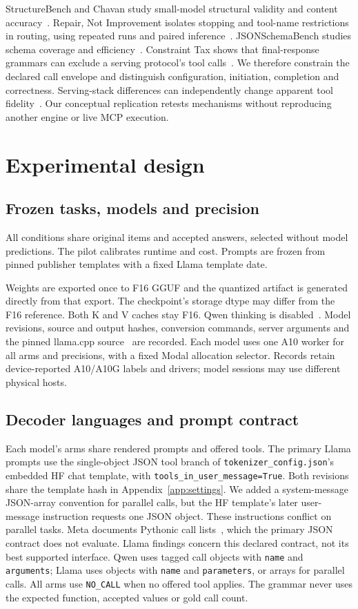 \documentclass[10pt,twocolumn]{article}
\begin{document}
StructureBench and Chavan study small-model structural validity and content accuracy~\cite{structure,chavan}. Repair, Not Improvement isolates stopping and tool-name restrictions in routing, using repeated runs and paired inference~\cite{repair}. JSONSchemaBench studies schema coverage and efficiency~\cite{schema}. Constraint Tax shows that final-response grammars can exclude a serving protocol's tool calls~\cite{constrainttax}. We therefore constrain the declared call envelope and distinguish configuration, initiation, completion and correctness. Serving-stack differences can independently change apparent tool fidelity~\cite{serving}. Our conceptual replication retests mechanisms without reproducing another engine or live MCP execution.

\section{Experimental design}

\subsection{Frozen tasks, models and precision}

All conditions share original items and accepted answers, selected without model predictions. The pilot calibrates runtime and cost. Prompts are frozen from pinned publisher templates with a fixed Llama template date.

Weights are exported once to F16 GGUF and the quantized artifact is generated directly from that export. The checkpoint's storage dtype may differ from the F16 reference. Both K and V caches stay F16. Qwen thinking is disabled~\cite{qwencard}. Model revisions, source and output hashes, conversion commands, server arguments and the pinned llama.cpp source~\cite{llamacpp} are recorded. Each model uses one A10 worker for all arms and precisions, with a fixed Modal allocation selector. Records retain device-reported A10/A10G labels and drivers; model sessions may use different physical hosts.

\subsection{Decoder languages and prompt contract}
Each model's arms share rendered prompts and offered tools. The primary Llama prompts use the single-object JSON tool branch of \texttt{tokenizer\_config.json}'s embedded HF chat template, with \texttt{tools\_in\_user\_message=True}. Both revisions share the template hash in Appendix~\ref{app:settings}. We added a system-message JSON-array convention for parallel calls, but the HF template's later user-message instruction requests one JSON object. These instructions conflict on parallel tasks. Meta documents Pythonic call lists~\cite{metaprompt}, which the primary JSON contract does not evaluate. Llama findings concern this declared contract, not its best supported interface. Qwen uses tagged call objects with \texttt{name} and \texttt{arguments}; Llama uses objects with \texttt{name} and \texttt{parameters}, or arrays for parallel calls. All arms use \texttt{NO\_CALL} when no offered tool applies. The grammar never uses the expected function, accepted values or gold call count.
\end{document}
